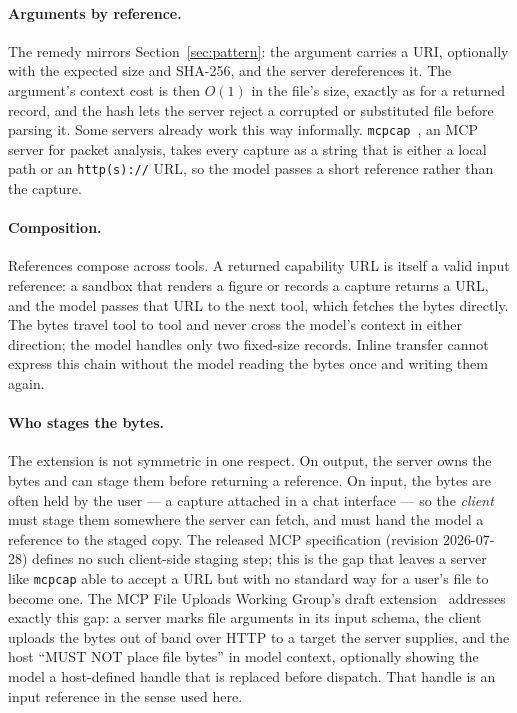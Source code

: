 \documentclass[11pt]{article}
\begin{document}
\paragraph{Arguments by reference.} The remedy mirrors Section~\ref{sec:pattern}: the argument carries a URI, optionally with the expected size and SHA-256, and the server dereferences it. The argument's context cost is then $O(1)$ in the file's size, exactly as for a returned record, and the hash lets the server reject a corrupted or substituted file before parsing it. Some servers already work this way informally. \texttt{mcpcap}~\citep{mcpcap}, an MCP server for packet analysis, takes every capture as a string that is either a local path or an \texttt{http(s)://} URL, so the model passes a short reference rather than the capture.

\paragraph{Composition.} References compose across tools. A returned capability URL is itself a valid input reference: a sandbox that renders a figure or records a capture returns a URL, and the model passes that URL to the next tool, which fetches the bytes directly. The bytes travel tool to tool and never cross the model's context in either direction; the model handles only two fixed-size records. Inline transfer cannot express this chain without the model reading the bytes once and writing them again.

\paragraph{Who stages the bytes.} The extension is not symmetric in one respect. On output, the server owns the bytes and can stage them before returning a reference. On input, the bytes are often held by the user --- a capture attached in a chat interface --- so the \emph{client} must stage them somewhere the server can fetch, and must hand the model a reference to the staged copy. The released MCP specification (revision 2026-07-28) defines no such client-side staging step; this is the gap that leaves a server like \texttt{mcpcap} able to accept a URL but with no standard way for a user's file to become one. The MCP File Uploads Working Group's draft extension~\citep{mcpfiles} addresses exactly this gap: a server marks file arguments in its input schema, the client uploads the bytes out of band over HTTP to a target the server supplies, and the host ``MUST NOT place file bytes'' in model context, optionally showing the model a host-defined handle that is replaced before dispatch. That handle is an input reference in the sense used here.
\end{document}
